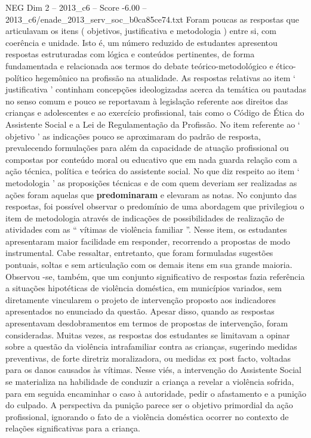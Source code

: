 \begin{textsample}{NEG Dim 2 – 2013\_c6 – Score -6.00 – 2013\_c6/enade\_2013\_serv\_soc\_b0ca85ce74.txt}
Foram poucas as respostas que articulavam os itens ( objetivos, justificativa e metodologia ) entre si, com coerência e unidade.
Isto é, um número reduzido de estudantes apresentou respostas estruturadas com lógica e conteúdos pertinentes, de forma fundamentada e relacionada aos termos do debate teórico-metodológico e ético-político hegemônico na profissão na atualidade.
As respostas relativas ao item ‘ justificativa ’ continham concepções ideologizadas acerca da temática ou pautadas no senso comum e pouco se reportavam à legislação referente aos direitos das crianças e adolescentes e ao exercício profissional, tais como o Código de Ética do Assistente Social e a Lei de Regulamentação da Profissão.
No item referente ao ‘ objetivo ’ as indicações pouco se aproximaram do padrão de resposta, prevalecendo formulações para além da capacidade de atuação profissional ou compostas por conteúdo moral ou educativo que em nada guarda relação com a ação técnica, política e teórica do assistente social.
No que diz respeito ao item ‘ metodologia ’ as proposições técnicas e de com quem deveriam ser realizadas as ações foram aquelas que \textbf{predominaram} e elevaram as notas.
No conjunto das respostas, foi possível observar o predomínio de uma abordagem que privilegiou o item de metodologia através de indicações de possibilidades de realização de atividades com as “ vítimas de violência familiar ”.
Nesse item, os estudantes apresentaram maior facilidade em responder, recorrendo a propostas de modo instrumental.
Cabe ressaltar, entretanto, que foram formuladas sugestões pontuais, soltas e sem articulação com os demais itens em sua grande maioria.
Observou -se, também, que um conjunto significativo de respostas fazia referência a situações hipotéticas de violência doméstica, em municípios variados, sem diretamente vincularem o projeto de intervenção proposto aos indicadores apresentados no enunciado da questão.
Apesar disso, quando as respostas apresentavam desdobramentos em termos de propostas de intervenção, foram consideradas.
Muitas vezes, as respostas dos estudantes se limitavam a opinar sobre a questão da violência intrafamiliar contra as crianças, sugerindo medidas preventivas, de forte diretriz moralizadora, ou medidas ex post facto, voltadas para os danos causados às vítimas.
Nesse viés, a intervenção do Assistente Social se materializa na habilidade de conduzir a criança a revelar a violência sofrida, para em seguida encaminhar o caso à autoridade, pedir o afastamento e a punição do culpado.
A perspectiva da punição parece ser o objetivo primordial da ação profissional, ignorando o fato de a violência doméstica ocorrer no contexto de relações significativas para a criança.

\end{textsample}
